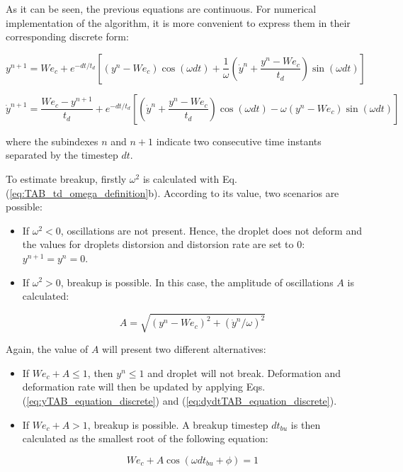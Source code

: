 As it can be seen, the previous equations are continuous. For numerical implementation of the algorithm, it is more convenient to express them in their corresponding discrete form:

\begin{equation}
\label{eq:yTAB_equation_discrete}
y^{n+1} = We_c + e^{- dt / t_d} \left[ \left( y^n - We_c \right) \cos \left( \omega dt \right) + \frac{1}{\omega}\left( \dot{y}^n + \frac{y^n - We_c}{t_d} \right) \sin \left( \omega dt \right)   \right]
\end{equation}

\begin{equation}
\label{eq:dydtTAB_equation_discrete}
\dot{y}^{n+1} = \frac{We_c - y^{n+1} }{t_d} + e^{- dt / t_d} \left[ \left( \dot{y}^n + \frac{y^n - We_c}{t_d} \right) \cos \left( \omega dt \right) - \omega \left( y^n - We_c \right) \sin \left( \omega dt \right)  \right]
\end{equation}

where the subindexes $n$ and $n+1$ indicate two consecutive time instants separated by the timestep $dt$.

To estimate breakup, firstly $\omega^2$ is calculated with Eq. (\ref{eq:TAB_td_omega_definition}b). According to its value, two scenarios are possible:

\begin{itemize}

	\item If $\omega^2 < 0$, oscillations are not present. Hence, the droplet does not deform and the values for droplets distorsion and distorsion rate are set to $0$: $y^{n+1} = y^n = 0$.
	
	\item If $\omega^2 > 0$, breakup is possible. In this case, the amplitude of oscillations $A$ is calculated:
	
	\begin{equation}
	A = \sqrt{\left( y^n - We_c \right)^2 + \left( \dot{y}^n / \omega \right)^2}
	\end{equation}

\end{itemize}

Again, the value of $A$ will present two different alternatives:

\begin{itemize}

	\item If $We_c + A \leq 1$, then $y^n \leq 1$ and droplet will not break. Deformation and deformation rate will then be updated by applying Eqs. (\ref{eq:yTAB_equation_discrete}) and (\ref{eq:dydtTAB_equation_discrete}).
	
	\item If $We_c + A > 1$, breakup is possible. A breakup timestep $dt_{bu}$ is then calculated as the smallest root of the following equation:
	
	\begin{equation}
	\label{eq:TAB_dtbu_obtention}
	We_c + A \cos \left( \omega dt_{bu} + \phi  \right) = 1
	\end{equation}

\end{itemize}

